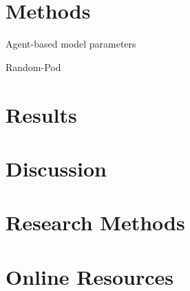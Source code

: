 \documentclass[manuscript,screen,review,acmsmall]{acmart}
\begin{document}
\section{Methods\label{sec:methods}}

Agent-based model parameters

Random-Pod

\section{Results}

\section{Discussion}


\begin{acks}

\end{acks}




\appendix

\section{Research Methods}

\section{Online Resources}
\end{document}
